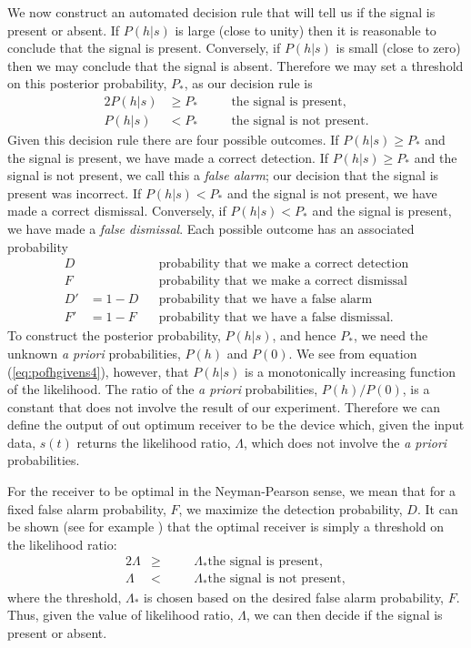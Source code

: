 We now construct an automated decision rule that will tell us if the signal is
present or absent.  If $P(h|s)$ is large (close to unity) then it is
reasonable to conclude that the signal is present.  Conversely, if $P(h|s)$ is
small (close to zero) then we may conclude that the signal is absent.
Therefore we may set a threshold on this posterior probability, $P_\ast$, as
our decision rule is
\begin{alignat}{2}
P(h|s) &\ge P_* &\quad&\text{the signal is present}, \\
P(h|s) &< P_* &&\text{the signal is not present}.
\end{alignat}
Given this decision rule there are four possible outcomes. If $P(h|s) \ge
P_*$ and the signal is present, we have made a correct detection. If $P(h|s)
\ge P_*$ and the signal is not present, we call this a \emph{false alarm}; our
decision that the signal is present was incorrect. If $P(h|s) < P_*$ and the
signal is not present, we have made a correct dismissal. Conversely, if
$P(h|s) < P_*$ and the signal is present, we have made a \emph{false
dismissal}. Each possible outcome has an associated probability
\begin{align}
D & &&\text{probability that we make a correct detection} \\
F & &&\text{probability that we make a correct dismissal} \\
D' &= 1 - D &&\text{probability that we have a false alarm} \\
F' &= 1 - F &&\text{probability that we have a false dismissal}.
\end{align}
To construct the posterior probability, $P(h|s)$, and hence $P_\ast$, we need
the unknown \emph{a priori} probabilities, $P(h)$ and $P(0)$. We see from
equation (\ref{eq:pofhgivens4}), however, that $P(h|s)$ is a monotonically
increasing function of the likelihood. The ratio of the \emph{a priori}
probabilities, $P(h)/P(0)$, is a constant that does not involve the result of
our experiment. Therefore we can define the output of out optimum receiver to be
the device which, given the input data, $s(t)$ returns the likelihood ratio,
$\Lambda$, which does not involve the \emph{a priori} probabilities. 

For the receiver to be optimal in the Neyman-Pearson sense, we mean that for a
fixed false alarm probability, $F$, we maximize the detection probability,
$D$. It can be shown (see for example \cite{casella:2002}) that the optimal
receiver is simply a threshold on the likelihood ratio:
\begin{alignat}{2}
\Lambda &\ge &\quad& \Lambda_\ast \text{the signal is present}, \\
\Lambda &< && \Lambda_\ast \text{the signal is not present},
\end{alignat}
where the threshold, $\Lambda_\ast$ is chosen based on the desired false alarm
probability, $F$. Thus, given the value of likelihood ratio, $\Lambda$, we
can then decide if the signal is present or absent. 


